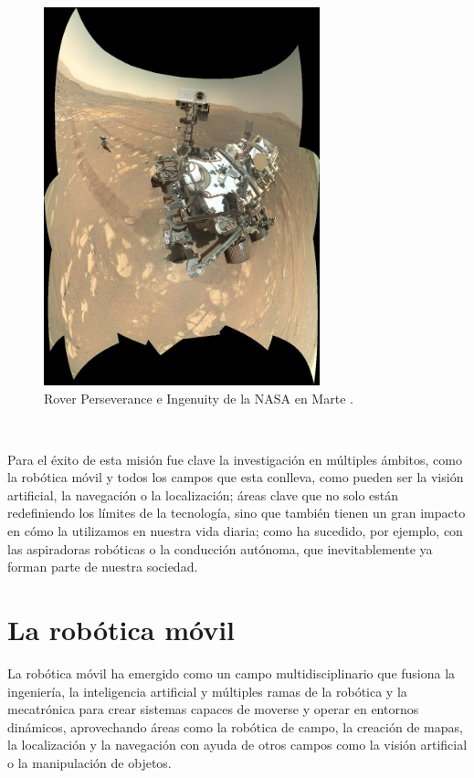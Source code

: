 \begin{figure} [h!]
  \begin{center}
    \includegraphics[width=8cm]{figs/perseverance_ingenuity_selfie_panorama}
  \end{center}
  \caption{Rover Perseverance e Ingenuity de la NASA en Marte \cite{perseverance_ingenuity}.}
  \label{fig:rover}
\end{figure}\

Para el éxito de esta misión fue clave la investigación en múltiples ámbitos,
como la robótica móvil y todos los campos que esta conlleva, como pueden ser la
visión artificial, la navegación o la localización; áreas clave que no solo
están redefiniendo los límites de la tecnología, sino que también tienen un gran
impacto en cómo la utilizamos en nuestra vida diaria; como ha sucedido, por
ejemplo, con las aspiradoras robóticas o la conducción autónoma, que
inevitablemente ya forman parte de nuestra sociedad.



\section{La robótica móvil}
\label{sec:robotica_movil} %

La robótica móvil ha emergido como un campo multidisciplinario que fusiona la
ingeniería, la inteligencia artificial y múltiples ramas de la robótica y la
mecatrónica para crear sistemas capaces de moverse y operar en entornos
dinámicos, aprovechando áreas como la robótica de campo, la creación de mapas,
la localización y la navegación con ayuda de otros campos como la visión
artificial o la manipulación de objetos.
\\

